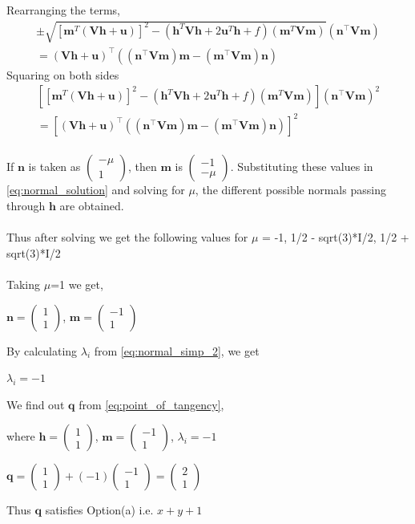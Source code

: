 \documentclass[journal,10pt,twocolumn]{article}
\let\vec\mathbf
\newcommand{\myvec}[1]{\ensuremath{\begin{pmatrix}#1\end{pmatrix}}}
\providecommand{\brak}[1]{\ensuremath{\left(#1\right)}}
\providecommand{\sbrak}[1]{\ensuremath{{}\left[#1\right]}}
\begin{document}
Rearranging the terms,
{\tiny
\begin{multline}
	\pm \sqrt{\sbrak{\vec{m}^T\brak{\vec{V}\vec{h}+\vec{u}}}^2-\brak{\vec{h}^T\vec{V}\vec{h} + 2\vec{u}^T\vec{h} +f}\brak{\vec{m}^T\vec{V}\vec{m}}} \brak{\vec{n}^\top\vec{V}\vec{m}} \\ = \brak{\vec{Vh}+\vec{u}}^\top\brak{\brak{\vec{n}^\top\vec{V}\vec{m}}\vec{m}-\brak{\vec{m}^\top\vec{V}\vec{m}}\vec{n}}
\end{multline}
}
Squaring on both sides
{\tiny
\begin{multline}
	\sbrak{\sbrak{\vec{m}^T\brak{\vec{V}\vec{h}+\vec{u}}}^2-\brak{\vec{h}^T\vec{V}\vec{h} + 2\vec{u}^T\vec{h} +f}\brak{\vec{m}^T\vec{V}\vec{m}}}\brak{\vec{n}^\top\vec{V}\vec{m}}^2 \\ = \sbrak{\brak{\vec{Vh}+\vec{u}}^\top\brak{\brak{\vec{n}^\top\vec{V}\vec{m}}\vec{m}-\brak{\vec{m}^\top\vec{V}\vec{m}}\vec{n}}}^2
	\label{eq:normal_solution}
\end{multline}
}\\
If $\vec{n}$ is taken as $\myvec{-\mu \\ 1}$, then $\vec{m}$ is $\myvec{-1 \\ -\mu}$. Substituting these values in \eqref{eq:normal_solution} and solving for $\mu$, the different possible normals passing through $\vec{h}$ are obtained.\\\\
Thus after solving we get the following values for $\mu$ = {-1, 1/2 - sqrt(3)*I/2, 1/2 + sqrt(3)*I/2}\\\\
Taking $\mu$=1 we get,
\begin{center}
$\vec{n} = \myvec{1 \\ 1}$, $\vec{m} = \myvec{-1 \\ 1}$\\
\end{center}
By calculating $\lambda_i$ from \eqref{eq:normal_simp_2}, we get
\begin{center}
    $\lambda_i = -1$
\end{center}
We find out $\vec{q}$ from \eqref{eq:point_of_tangency},
\begin{center}
where $\vec{h} = \myvec{1 \\ 1}$, $\vec{m} = \myvec{-1 \\ 1}$, $\lambda_i = -1$
\end{center}
\begin{center}
    $\vec{q} = \myvec{1 \\ 1} + (-1)\myvec{-1 \\ 1} = $\myvec{2 \\ 1}
\end{center}
\begin{center}
    Thus $\vec{q}$ satisfies Option(a) i.e. $x+y+1$
\end{center} 
\end{document}
